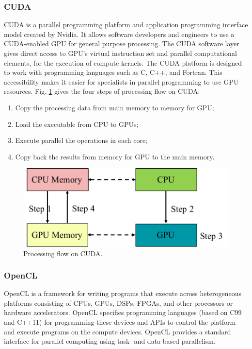 \subsubsection{CUDA}

CUDA \cite{nvidia2011nvidia} is a parallel programming platform and application programming interface model created by Nvidia. It allows software developers and engineers to use a CUDA-enabled GPU for general purpose processing. The CUDA software layer gives direct access to GPU's virtual instruction set and parallel computational elements, for the execution of compute kernels. The CUDA platform is designed to work with programming languages such as C, C++, and Fortran. This accessibility makes it easier for specialists in parallel programming to use GPU resources. Fig. \ref{cuda_flow} gives the four steps of processing flow on CUDA:

\begin{enumerate}
	\item Copy the processing data from main memory to memory for GPU;
	\item Load the executable from CPU to GPUs;
	\item Execute parallel the operations in each core;
	\item Copy back the results from memory for GPU to the main memory.
\end{enumerate}

\begin{figure}[htbp]
	\centering
	\includegraphics[width=0.72\linewidth]{fig/CUDA.pdf}
	\caption{Processing flow on CUDA.}
	\label{cuda_flow}
\end{figure}

\subsubsection{OpenCL}

OpenCL \cite{munshi2009opencl} is a framework for writing programs that execute across heterogeneous platforms consisting of CPUs, GPUs, DSPs, FPGAs, and other processors or hardware accelerators. OpenCL specifies programming languages (based on C99 and C++11) for programming these devices and APIs to control the platform and execute programs on the compute devices. OpenCL provides a standard interface for parallel computing using task- and data-based parallelism.

